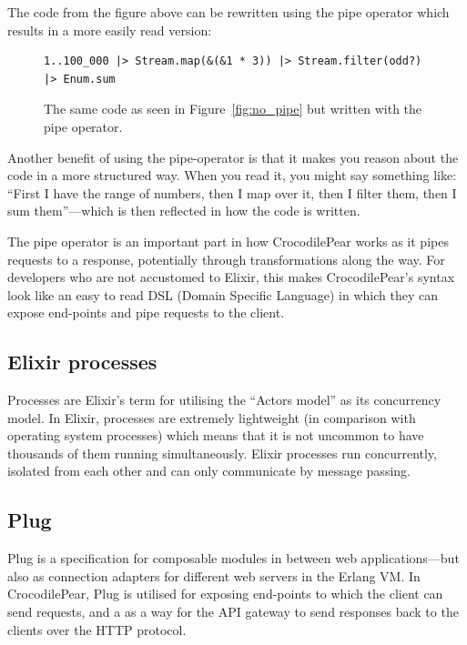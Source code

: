 \documentclass{cslthse-msc}
\begin{document}
\noindent The code from the figure above can be rewritten using the pipe operator which results in a more easily read version:

\begin{figure}[H]
  \centering
\begin{lstlisting}[breaklines=true,frame=single]
1..100_000 |> Stream.map(&(&1 * 3)) |> Stream.filter(odd?) |> Enum.sum
\end{lstlisting}
  \caption{The same code as seen in Figure~\ref{fig:no_pipe} but written with the pipe operator.}
\end{figure}

Another benefit of using the pipe-operator is that it makes you reason about the code in a more structured way. When you read it, you might say something like: \enquote{First I have the range of numbers, then I map over it, then I filter them, then I sum them}---which is then reflected in how the code is written.

The pipe operator is an important part in how CrocodilePear works as it pipes requests to a response, potentially through transformations along the way. For developers who are not accustomed to Elixir, this makes CrocodilePear's syntax look like an easy to read DSL (Domain Specific Language) in which they can expose end-points and pipe requests to the client.

\subsection{Elixir processes}
Processes are Elixir's term for utilising the \enquote{Actors model} as its concurrency model. In Elixir, processes are extremely lightweight (in comparison with operating system processes) which means that it is not uncommon to have thousands of them running simultaneously. Elixir processes run concurrently, isolated from each other and can only communicate by message passing\cite{elixir_processes}.

\subsection{Plug}
Plug is a specification for composable modules in between web applications---but also as connection adapters for different web servers in the Erlang VM\cite{plug}. In CrocodilePear, Plug is utilised for exposing end-points to which the client can send requests, and a as a way for the API gateway to send responses back to the clients over the HTTP protocol.
\end{document}
